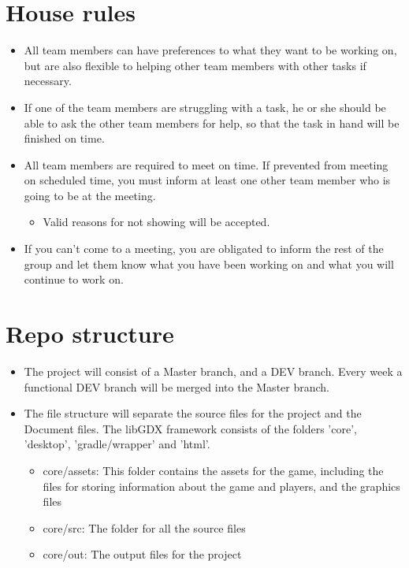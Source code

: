 \documentclass{article}
\begin{document}
\newpage
\section*{House rules}
\begin{itemize}
\item All team members can have preferences to what they want to be working on, but are also flexible to helping other team members with other tasks if necessary.
\item If one of the team members are struggling with a task, he or she should be able to ask the other team members for help, so that the task in hand will be finished on time.
\item All team members are required to meet on time. If prevented from meeting on scheduled time, you must inform at least one other team member who is going to be at the meeting.
	\begin{itemize}
	\item Valid reasons for not showing will be accepted.
	\end{itemize}
\item If you can't come to a meeting, you are obligated to inform the rest of the group and let them know what you have been working on and what you will continue to work on.
\end{itemize}
\section*{Repo structure}
\begin{itemize}
\item The project will consist of a Master branch, and a DEV branch. Every week a functional DEV branch will be merged into the Master branch.
\item The file structure will separate the source files for the project and the Document files. The libGDX framework consists of the folders 'core', 'desktop', 'gradle/wrapper' and 'html'.
    \begin{itemize}
        \item core/assets: This folder contains the assets for the game, including the files for storing information about the game and players, and the graphics files
        \item core/src: The folder for all the source files
        \item core/out: The output files for the project
        \end{itemize}
\end{itemize}
\end{document}
